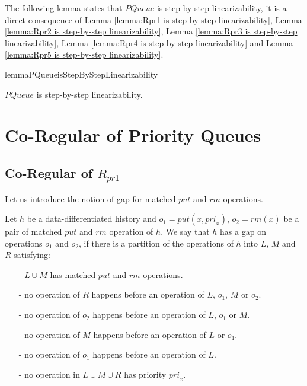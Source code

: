 \documentclass{llncs}
\begin{document}
The following lemma states that $\textit{PQueue}$ is step-by-step linearizability, it is a direct consequence of Lemma \ref{lemma:Rpr1 is step-by-step linearizability}, Lemma \ref{lemma:Rpr2 is step-by-step linearizability}, Lemma \ref{lemma:Rpr3 is step-by-step linearizability}, Lemma \ref{lemma:Rpr4 is step-by-step linearizability} and Lemma \ref{lemma:Rpr5 is step-by-step linearizability}.


\begin{restatable}{lemma}{PQueueisStepByStepLinearizability}
\label{lemma:PQueue is step-by-step linearizability}

$\textit{PQueue}$ is step-by-step linearizability.

\end{restatable}




\section{Co-Regular of Priority Queues}
\label{sec:co-regular of priority queues}




\subsection{Co-Regular of $R_{\textit{pr1}}$}
\label{subsec:co-regular of Rpr1}

Let us introduce the notion of gap for matched $\textit{put}$ and $\textit{rm}$ operations.

\begin{definition}\label{def:gap for matched put and rm operations}

Let $h$ be a data-differentiated history and $o_1 = \textit{put}(x,\textit{pri}_x)$, $o_2 = \textit{rm}(x)$ be a pair of matched $\textit{put}$ and $\textit{rm}$ operation of $h$. We say that $h$ has a gap on operations $o_1$ and $o_2$, if there is a partition of the operations of $h$ into $L$, $M$ and $R$ satisfying:
\begin{itemize}
\setlength{\itemsep}{0.5pt}
\item[-] $L \cup M$ has matched $\textit{put}$ and $\textit{rm}$ operations.

\item[-] no operation of $R$ happens before an operation of $L$, $o_1$, $M$ or $o_2$.

\item[-] no operation of $o_2$ happens before an operation of $L$, $o_1$ or $M$.

\item[-] no operation of $M$ happens before an operation of $L$ or $o_1$.

\item[-] no operation of $o_1$ happens before an operation of $L$.

\item[-] no operation in $L \cup M \cup R$ has priority $\textit{pri}_x$.
\end{itemize}
\end{definition}
\end{document}
